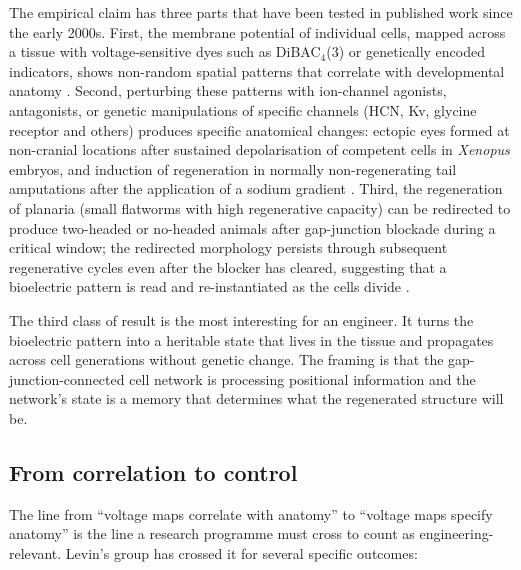 The empirical claim has three parts that have been tested in published
work since the early 2000s. First, the membrane potential of individual
cells, mapped across a tissue with voltage-sensitive dyes such as
DiBAC$_4$(3) or genetically encoded indicators, shows non-random
spatial patterns that correlate with developmental anatomy
\cite{paper:v6c13-adams-vmem-2007}. Second, perturbing these patterns
with ion-channel agonists, antagonists, or genetic manipulations of
specific channels (HCN, Kv, glycine receptor and others) produces
specific anatomical changes: ectopic eyes formed at non-cranial
locations after sustained depolarisation of competent cells in
\textit{Xenopus} embryos, and induction of regeneration in normally
non-regenerating tail amputations after the application of a sodium
gradient \cite{paper:v6c13-pai-eye-2012, paper:v6c13-tseng-tail-2010}.
Third, the regeneration of planaria (small flatworms with high
regenerative capacity) can be redirected to produce two-headed or
no-headed animals after gap-junction blockade during a critical window;
the redirected morphology persists through subsequent regenerative
cycles even after the blocker has cleared, suggesting that a
bioelectric pattern is read and re-instantiated as the cells divide
\cite{paper:v6c13-oviedo-planarian-2010}.

The third class of result is the most interesting for an engineer. It
turns the bioelectric pattern into a heritable state that lives in the
tissue and propagates across cell generations without genetic change.
The framing is that the gap-junction-connected cell network is
processing positional information and the network's state is a memory
that determines what the regenerated structure will be.

\subsection{From correlation to control}

The line from ``voltage maps correlate with anatomy'' to ``voltage maps
specify anatomy'' is the line a research programme must cross to count
as engineering-relevant. Levin's group has crossed it for several
specific outcomes:

